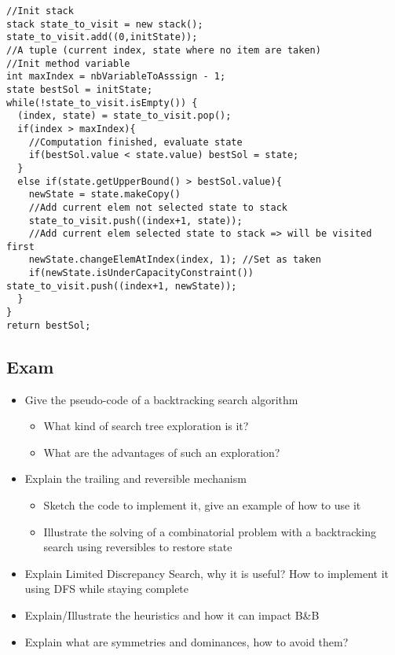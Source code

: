 \begin{lstlisting}
//Init stack
stack state_to_visit = new stack();
state_to_visit.add((0,initState)); 
//A tuple (current index, state where no item are taken)
//Init method variable
int maxIndex = nbVariableToAsssign - 1;
state bestSol = initState;
while(!state_to_visit.isEmpty()) {
  (index, state) = state_to_visit.pop();
  if(index > maxIndex){
  	//Computation finished, evaluate state
  	if(bestSol.value < state.value) bestSol = state;
  }
  else if(state.getUpperBound() > bestSol.value){
  	newState = state.makeCopy()
  	//Add current elem not selected state to stack
  	state_to_visit.push((index+1, state));
  	//Add current elem selected state to stack => will be visited first
  	newState.changeElemAtIndex(index, 1); //Set as taken
  	if(newState.isUnderCapacityConstraint()) state_to_visit.push((index+1, newState));
  }
}
return bestSol; 
\end{lstlisting}

\subsection{Exam}
\begin{itemize}
    \item Give the pseudo-code of a backtracking search algorithm
        \begin{itemize}
            \item  What kind of search tree exploration is it?
            \item  What are the advantages of such an exploration?
        \end{itemize}
    \item Explain the trailing and reversible mechanism
        \begin{itemize}
            \item  Sketch the code to implement it, give an example of how to use
                it
            \item  Illustrate the solving of a combinatorial problem with a
                backtracking search using reversibles to restore state
        \end{itemize}
    \item  Explain Limited Discrepancy Search, why it is useful? How to
        implement it using DFS while staying complete
    \item  Explain/Illustrate the heuristics and how it can impact B\&B
    \item  Explain what are symmetries and dominances, how to avoid
        them?
\end{itemize}
